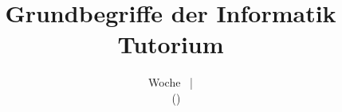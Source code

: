 

\title[GBI-Tutorium \mytutnumber, Woche \theweeknum]{Grundbegriffe der Informatik \\ Tutorium \mytutnumber}

\subtitle{Woche \theweeknum \ | \mydate{\theweeknum} \\ \myname \ \  \normalfont (\mailto{\mymail})}
\author[\myname]{\myname}
\date{\mydate{\theweeknum}\ }


\newcommand{\titleframe}{\frame{\titlepage}}

\newcommand{\starttut}[1]{\setcounter{weeknum}{#1}\pdfinfo{
		/Author (\myname)
		/Title  (GBI-Tutorium \mytutnumber, Woche \theweeknum)
	}\titleframe\frame{\frametitle{Inhalt}\tableofcontents} \AtBeginSection[]{%
\begin{frame}{Wo sind wir gerade?}
	\tableofcontents[currentsection]
\end{frame}\addtocounter{framenumber}{-1}}}


\newcommand{\framePrevEpisode}{
	\begin{headframe}
		\mylasttimestext
	\end{headframe}
}



